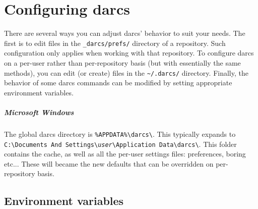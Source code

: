 %
%
%

\chapter{Configuring darcs}\label{configuring}

There are several ways you can adjust darcs' behavior to suit your needs.
The first is to edit files in the \verb!_darcs/prefs/! directory of a
repository.  Such configuration only applies when working with that
repository.  To configure darcs on a per-user rather than per-repository
basis (but with essentially the same methods), you can edit (or create)
files in the \verb!~/.darcs/! directory.
Finally, the behavior of some darcs commands can be modified by setting
appropriate environment variables.

\paragraph{Microsoft Windows}\label{ms_win}

The global darcs directory is \verb!%APPDATA%\darcs\!.  This typically expands to
\texttt{C:\textbackslash{}Documents And Settings\textbackslash{}\emph{user}\textbackslash{}Application Data\textbackslash{}darcs\textbackslash{}}.
This folder contains the cache, as well as all the per-user
settings files: preferences, boring etc... These will became the new defaults
that can be overridden on per-repository basis.





\section{Environment variables}

